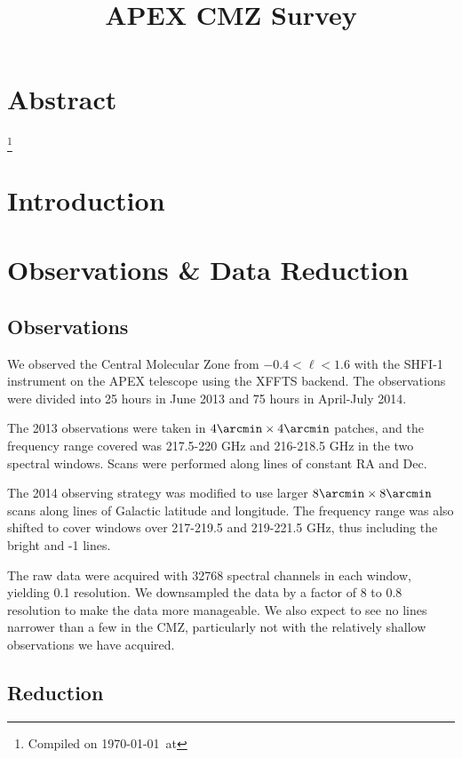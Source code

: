 

\title{APEX CMZ Survey}


\section{Abstract}

\footnote{Compiled on \today\ at \currenttime}


\section{Introduction}




\section{Observations \& Data Reduction}

\subsection{Observations}
We observed the Central Molecular Zone from $-0.4 < \ell < 1.6$ with the SHFI-1
instrument \citep{Vassilev2008a} on the APEX telescope using the XFFTS backend.
The observations were divided into 25 hours in June 2013 and 75 hours in
April-July 2014.  

The 2013 observations were taken in $4\arcmin \times 4\arcmin$ patches, and the
frequency range covered was 217.5-220 GHz and 216-218.5 GHz in the two spectral
windows.  Scans were performed along lines of constant RA and Dec.

The 2014 observing strategy was modified to use larger $8\arcmin \times
8\arcmin$ scans along lines of Galactic latitude and longitude.  The frequency
range was also shifted to cover windows over 217-219.5 and 219-221.5 GHz, thus
including the bright \thirteenco and -1 lines.

The raw data were acquired with 32768 spectral channels in each window, yielding
0.1 \kms resolution.  We downsampled the data by a factor of 8 to 0.8 \kms
resolution to make the data more manageable.  We also expect to see no lines
narrower than a few \kms in the CMZ, particularly not with the relatively
shallow observations we have acquired.

\subsection{Reduction}
